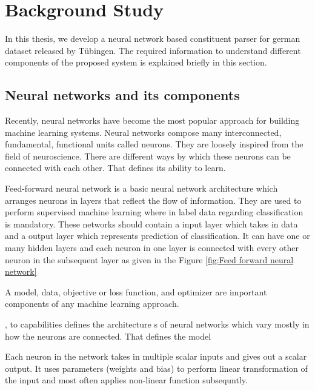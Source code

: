 \documentclass[a4paper, 11pt]{article}
\begin{document}



\pagebreak
\section{Background Study}
In this thesis, we develop a neural network based constituent parser for german dataset released by Tübingen. The required information to understand different components of the proposed system is explained briefly in this section. 

\subsection{Neural networks and its components}

Recently, neural networks have become the most popular approach for building machine learning systems. Neural networks compose many interconnected, fundamental, functional units called neurons. They are loosely inspired from the field of neuroscience. There are different ways by which these neurons can be connected with each other. That defines its ability to learn. 

Feed-forward neural network \parencite{Svozil1997} is a basic neural network architecture which arranges neurons in layers that reflect the flow of information. They are used to perform supervised machine learning where in label data regarding classification is mandatory. These networks should contain a input layer which takes in data and a output layer which represents prediction of classification. It can have one or many hidden layers and each neuron in one layer is connected with every other neuron in the subsequent layer as given in the Figure \ref{fig:Feed forward neural network}

A model, data, objective or loss function, and optimizer are important components of any machine learning approach.

,  to capabilities defines the architecture s of neural networks which vary mostly in how the neurons are connected. That defines the model

Each neuron in the network takes in multiple scalar inputs and gives out a scalar output. It uses parameters (weights and bias) to perform linear transformation of the input and most often applies non-linear function subsequntly.
\end{document}
